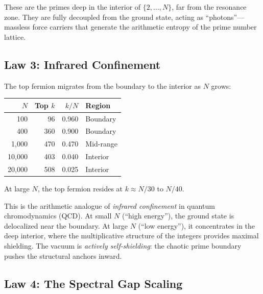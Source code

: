 \documentclass[11pt,a4paper]{article}
\begin{document}
These are the primes deep in the interior of $\{2, \ldots, N\}$,
far from the resonance zone. They are fully decoupled from the
ground state, acting as ``photons''---massless force carriers that
generate the arithmetic entropy of the prime number lattice.

\subsection{Law 3: Infrared Confinement}

\begin{observation}
\label{obs:confinement}
The top fermion migrates from the boundary to the interior as $N$ grows:
\begin{center}
\begin{tabular}{@{}rrrl@{}}
\toprule
$N$ & Top $k$ & $k/N$ & Region \\
\midrule
100     & 96    & 0.960 & Boundary \\
400     & 360   & 0.900 & Boundary \\
1{,}000    & 470   & 0.470 & Mid-range \\
10{,}000   & 403   & 0.040 & Interior \\
20{,}000   & 508   & 0.025 & Interior \\
\bottomrule
\end{tabular}
\end{center}
At large $N$, the top fermion resides at $k \approx N/30$ to $N/40$.
\end{observation}

This is the arithmetic analogue of \emph{infrared confinement} in
quantum chromodynamics (QCD). At small $N$ (``high energy''), the
ground state is delocalized near the boundary. At large $N$
(``low energy''), it concentrates in the deep interior, where the
multiplicative structure of the integers provides maximal shielding.
The vacuum is \emph{actively self-shielding}: the chaotic prime boundary
pushes the structural anchors inward.

\subsection{Law 4: The Spectral Gap Scaling}
\end{document}
